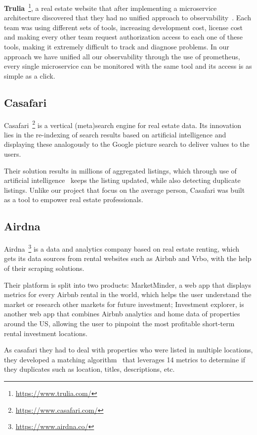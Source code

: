 \textbf{Trulia}~\footnote{\url{https://www.trulia.com/}}, a real estate website that after implementing a microservice architecture discovered that they had no unified approach to observability~\cite{trulia}. Each team was using different sets of tools, increasing development cost, license cost and making every other team request authorization access to each one of these tools, making it extremely difficult to track and diagnose problems. In our approach we have unified all our observability through the use of prometheus, every single microservice can be monitored with the same tool and its access is as simple as a click.

\subsection{Casafari}
\label{ss:casafari}

Casafari~\footnote{\url{https://www.casafari.com/}} is a vertical (meta)search engine for real estate data. Its innovation lies in the re-indexing of search results based on artificial intelligence and displaying these analogously to the Google picture search to deliver values to the users.

Their solution results in millions of aggregated listings, which through use of artificial intelligence~\cite{casafari-ai} keeps the listing updated, while also detecting duplicate listings. Unlike our project that focus on the average person, Casafari was built as a tool to empower real estate professionals.

\subsection{Airdna}
\label{ss:airdna}

Airdna~\footnote{\url{https://www.airdna.co/}} is a data and analytics company based on real estate renting, which gets its data sources from rental websites such as Airbnb and Vrbo, with the help of their scraping solutions.

Their platform is split into two products: MarketMinder, a web app that displays metrics for every Airbnb rental in the world, which helps the user understand the market or research other markets for future investment; Investment explorer, is another web app that combines Airbnb analytics and home data of properties around the US, allowing the user to pinpoint the most profitable short-term rental investment locations.

As casafari they had to deal with properties who were listed in multiple locations, they developed a matching algorithm~\cite{airdna-duplicates} that leverages 14 metrics to determine if they duplicates such as location, titles, descriptions, etc.

